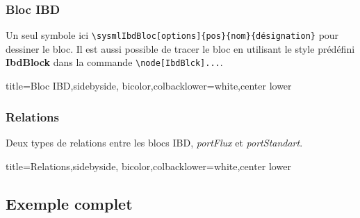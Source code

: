 \documentclass[a4paper,11pt]{article}                      %
\begin{document}
\subsubsection{Bloc IBD}

Un seul symbole ici \verb!\sysmlIbdBloc[options]{pos}{nom}{désignation}!  pour dessiner le bloc.  Il est aussi possible de tracer le bloc en utilisant le style prédéfini \textbf{IbdBlock}  dans la commande \verb!\node[IbdBlck]...!.


\begin{tcblisting}{title={Bloc IBD},sidebyside, bicolor,colbacklower=white,center lower}
\end{tcblisting}

\subsubsection{Relations}

Deux types de relations entre les blocs IBD, \textit{portFlux}  et \textit{portStandart}.


\begin{tcblisting}{title={Relations},sidebyside, bicolor,colbacklower=white,center lower}
\end{tcblisting}



\subsection{Exemple complet}
\end{document}
